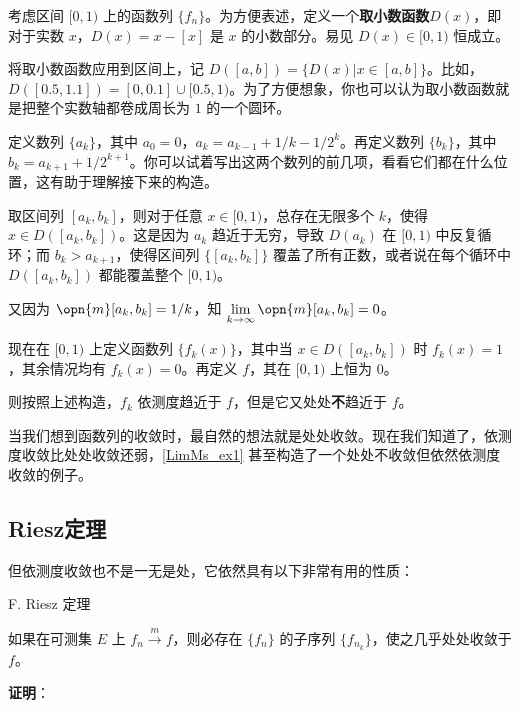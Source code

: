 \begin{example}{}\label{LimMs_ex1}

考虑区间 $[0, 1)$ 上的函数列 $\{f_n\}$。为方便表述，定义一个\textbf{取小数函数}$D(x)$，即对于实数 $x$，$D(x)=x-[x]$ 是 $x$ 的小数部分。易见 $D(x)\in [0, 1)$ 恒成立。

将取小数函数应用到区间上，记 $D([a, b])=\{D(x)|x\in[a, b]\}$。比如，$D([0.5, 1.1])=[0, 0.1]\cup[0.5, 1)$。为了方便想象，你也可以认为取小数函数就是把整个实数轴都卷成周长为 $1$ 的一个圆环。

定义数列 $\{a_k\}$，其中 $a_0=0$，$a_k=a_{k-1}+1/k-1/2^k$。再定义数列 $\{b_k\}$，其中 $b_k=a_{k+1}+1/2^{k+1}$。你可以试着写出这两个数列的前几项，看看它们都在什么位置，这有助于理解接下来的构造。

取区间列 $[a_k, b_k]$，则对于任意 $x\in[0, 1)$，总存在无限多个 $k$，使得 $x\in D([a_k, b_k])$。这是因为 $a_k$ 趋近于无穷，导致 $D(a_k)$ 在 $[0, 1)$ 中反复循环；而 $b_k>a_{k+1}$，使得区间列 $\{[a_k, b_k]\}$ 覆盖了所有正数，或者说在每个循环中 $D([a_k, b_k])$ 都能覆盖整个 $[0, 1)$。

又因为 $\opn{m}[a_k, b_k]=1/k$，知 $\lim\limits_{k\to \infty}\opn{m}[a_k, b_k]=0$。

现在在 $[0, 1)$ 上定义函数列 $\{f_k(x)\}$，其中当 $x\in D([a_k, b_k])$ 时 $f_k(x)=1$，其余情况均有 $f_k(x)=0$。再定义 $f$，其在 $[0, 1)$ 上恒为 $0$。

则按照上述构造，$f_k$ 依测度趋近于 $f$，但是它又处处\textbf{不}趋近于 $f$。

\end{example}

当我们想到函数列的收敛时，最自然的想法就是处处收敛。现在我们知道了，依测度收敛比处处收敛还弱，\autoref{LimMs_ex1} 甚至构造了一个处处不收敛但依然依测度收敛的例子。


\subsection{Riesz定理}



但依测度收敛也不是一无是处，它依然具有以下非常有用的性质：

\begin{theorem}{F. Riesz 定理}

如果在可测集 $E$ 上 $f_n\overset{m}\to f$，则必存在 $\{f_n\}$ 的子序列 $\{f_{n_k}\}$，使之几乎处处收敛于 $f$。

\end{theorem}

\textbf{证明}：

